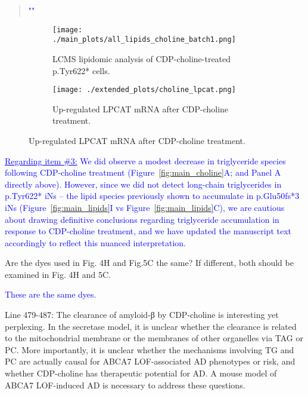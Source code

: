 \begin{quote}
	\textcolor{blue}{"\quoteI"}
\end{quote}

\begin{figure}[H] 
	\begin{subfigure}[t]{0.6\textwidth}
		\caption{LCMS lipidomic analysis of CDP-choline-treated p.Tyr622* cells.}
		\texttt{[image: ./main\_plots/all\_lipids\_choline\_batch1.png]}        
	\end{subfigure}
	\begin{subfigure}[t]{0.4\textwidth}
		\caption{Up-regulated LPCAT mRNA after CDP-choline treatment.}
		\texttt{[image: ./extended\_plots/choline\_lpcat.png]}        
	\end{subfigure}
\end{figure}

\textcolor{blue}{\underline{Regarding item \#3:} We did  observe a modest decrease in triglyceride species following CDP-choline treatment (Figure~\ref{fig:main_choline}A; and Panel A directly above). However, since we did not detect  long-chain triglycerides in p.Tyr622* iNs – the lipid species previously shown to accumulate in p.Glu50fs*3 iNs (Figure~\ref{fig:main_lipids}I vs Figure~\ref{fig:main_lipids}C), we are cautious about drawing definitive conclusions regarding triglyceride accumulation in response to CDP-choline treatment, and we have updated the manuscript text accordingly to reflect this nuanced interpretation.}

Are the dyes used in Fig. 4H and Fig.5C the same? If different, both should be examined in Fig. 4H and 5C.

\textcolor{blue}{These are the same dyes.}

Line 479-487: The clearance of amyloid-β by CDP-choline is interesting yet perplexing. In the secretase model, it is unclear whether the clearance is related to the mitochondrial membrane or the membranes of other organelles via TAG or PC. More importantly, it is unclear whether the mechanisms involving TG and PC are actually causal for ABCA7 LOF-associated AD phenotypes or risk, and whether CDP-choline has therapeutic potential for AD. A mouse model of ABCA7 LOF-induced AD is necessary to address these questions.

